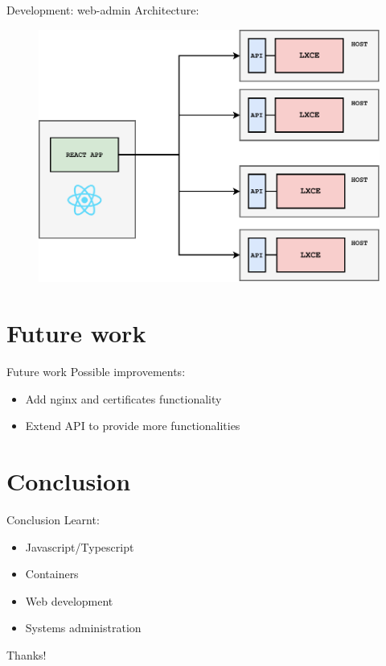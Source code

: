 \documentclass[10pt,english,handout,aspectradio=169]{beamer}
\begin{document}
\begin{frame}{Development: web-admin}
Architecture:
\begin{figure}
    \centering
    \includegraphics[scale=0.5]{img/web-admin-diagram.pdf} 
\end{figure}
\end{frame}

\section{Future work}
\begin{frame}{Future work}
Possible improvements:
    \begin{itemize}
        \item Add nginx and certificates functionality
        \item Extend API to provide more functionalities
    \end{itemize}
\end{frame}

\section{Conclusion}
\begin{frame}{Conclusion}
Learnt:
   \begin{itemize}
       \item Javascript/Typescript
       \item Containers 
       \item Web development
       \item Systems administration
   \end{itemize} 
\end{frame}

\begin{frame}[standout]
Thanks!
\end{frame}



\end{document}
